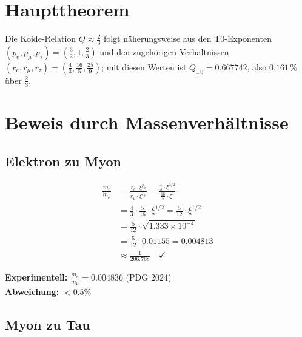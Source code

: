 	\section{Haupttheorem}
	
	\begin{theorem}
		Die Koide-Relation $Q \approx \frac{2}{3}$ folgt näherungsweise aus den T0-Exponenten $(p_e, p_\mu, p_\tau) = \left(\frac{3}{2}, 1, \frac{2}{3}\right)$ und den zugehörigen Verhältnissen $(r_e, r_\mu, r_\tau) = \left(\frac{4}{3}, \frac{16}{5}, \frac{25}{9}\right)$; mit diesen Werten ist $Q_{\text{T0}} = 0.667742$, also $0.161\,\%$ über $\frac{2}{3}$.
	\end{theorem}
	
	\section{Beweis durch Massenverhältnisse}
	
	\subsection{Elektron zu Myon}
	
	\begin{beweis}
		\allowdisplaybreaks
		\begin{align}
			\frac{m_e}{m_\mu} &= \frac{r_e \cdot \xi^{p_e}}{r_\mu \cdot \xi^{p_\mu}} = \frac{\frac{4}{3} \cdot \xi^{3/2}}{\frac{16}{5} \cdot \xi^1} \\
			&= \frac{4}{3} \cdot \frac{5}{16} \cdot \xi^{1/2} = \frac{5}{12} \cdot \xi^{1/2} \\
			&= \frac{5}{12} \cdot \sqrt{1.333 \times 10^{-4}} \\
			&= \frac{5}{12} \cdot 0.01155 = 0.004813 \\
			&\approx \frac{1}{206.768} \quad \checkmark
		\end{align}
		
		\textbf{Experimentell:} $\frac{m_e}{m_\mu} = 0.004836$ (PDG 2024)\\
		\textbf{Abweichung:} $< 0.5\%$
	\end{beweis}
	
	\subsection{Myon zu Tau}
	
